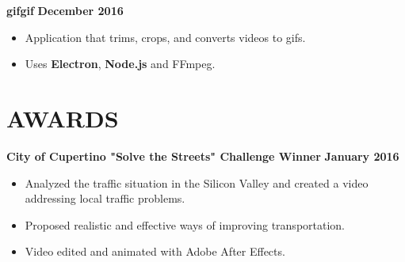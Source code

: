 \documentclass{res}
\begin{document}
\begin{resume}
		{\bf gifgif} \hfill {\bf December 2016} \\
			\vspace{-3.5mm}
			\begin{itemize} \itemsep -2pt
				\item Application that trims, crops, and converts videos to gifs.
				\item Uses {\bf Electron}, {\bf Node.js} and FFmpeg.
			\end{itemize}

		\section{AWARDS}
		\vspace{6pt}

		{\bf City of Cupertino "Solve the Streets" Challenge Winner} \hfill {\bf January 2016} \\
			\vspace{-3.5mm}
			\begin{itemize} \itemsep -2pt
				\item Analyzed the traffic situation in the Silicon Valley and created a video addressing local traffic problems.
				\item Proposed realistic and effective ways of improving transportation.
				\item Video edited and animated with Adobe After Effects.
			\end{itemize}

	\end{resume} 
\end{document}
